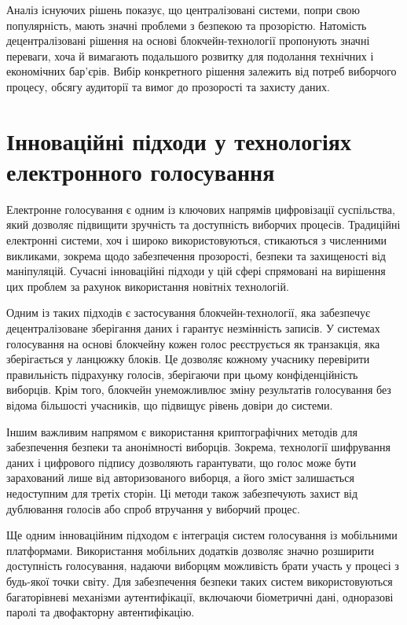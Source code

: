 \documentclass[14pt]{extreport}
\begin{document}
  Аналіз існуючих рішень показує, що централізовані системи, попри свою популярність, мають значні проблеми з безпекою та прозорістю. Натомість децентралізовані рішення на основі блокчейн-технології пропонують значні переваги, хоча й вимагають подальшого розвитку для подолання технічних і економічних бар'єрів. Вибір конкретного рішення залежить від потреб виборчого процесу, обсягу аудиторії та вимог до прозорості та захисту даних.
  
  \section{Інноваційні підходи у технологіях електронного голосування}
  
    Електронне голосування є одним із ключових напрямів цифровізації суспільства, який дозволяє підвищити зручність та доступність виборчих процесів. Традиційні електронні системи, хоч і широко використовуються, стикаються з численними викликами, зокрема щодо забезпечення прозорості, безпеки та захищеності від маніпуляцій. Сучасні інноваційні підходи у цій сфері спрямовані на вирішення цих проблем за рахунок використання новітніх технологій.

  Одним із таких підходів є застосування блокчейн-технології, яка забезпечує децентралізоване зберігання даних і гарантує незмінність записів. У системах голосування на основі блокчейну кожен голос реєструється як транзакція, яка зберігається у ланцюжку блоків. Це дозволяє кожному учаснику перевірити правильність підрахунку голосів, зберігаючи при цьому конфіденційність виборців. Крім того, блокчейн унеможливлює зміну результатів голосування без відома більшості учасників, що підвищує рівень довіри до системи.

  Іншим важливим напрямом є використання криптографічних методів для забезпечення безпеки та анонімності виборців. Зокрема, технології шифрування даних і цифрового підпису дозволяють гарантувати, що голос може бути зарахований лише від авторизованого виборця, а його зміст залишається недоступним для третіх сторін. Ці методи також забезпечують захист від дублювання голосів або спроб втручання у виборчий процес.

  Ще одним інноваційним підходом є інтеграція систем голосування із мобільними платформами. Використання мобільних додатків дозволяє значно розширити доступність голосування, надаючи виборцям можливість брати участь у процесі з будь-якої точки світу. Для забезпечення безпеки таких систем використовуються багаторівневі механізми аутентифікації, включаючи біометричні дані, одноразові паролі та двофакторну автентифікацію.
\end{document}
